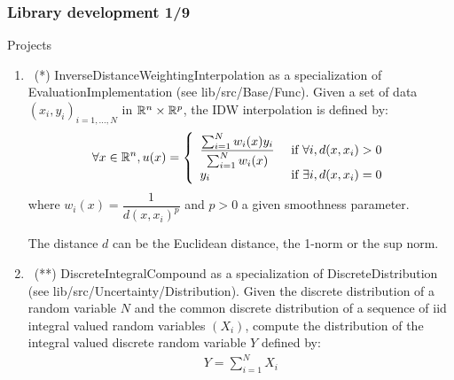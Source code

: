 \documentclass[8pt]{beamer}
\begin{document}
\begin{frame}
  \frametitle{Library development 1/9}
  \begin{block}{Projects}
    \begin{enumerate}
    \item~(*) \alert{\ttfamily InverseDistanceWeightingInterpolation} as a specialization of \alert{\ttfamily EvaluationImplementation} (see {\ttfamily lib/src/Base/Func}). Given a set of data $(x_i, y_i)_{i=1,\dots,N}$ in ${\mathbb R}^n\times{\mathbb R}^p$, the IDW interpolation is defined by:
      \begin{align}
        \forall x\in{\mathbb R}^n, u(x)=\left\{\begin{array}{ll}
                                        \dfrac{\sum_{i=1}^Nw_i(x)y_i}{\sum_{i=1}^Nw_i(x)} & \mbox{ if } \forall i, d(x, x_i) > 0\\
                                        y_i & \mbox{ if } \exists i, d(x, x_i)=0
                                      \end{array}
                                              \right.
      \end{align}
      where $w_i(x)=\dfrac{1}{d(x, x_i)^p}$ and $p>0$ a given smoothness parameter.

      The distance $d$ can be the Euclidean distance, the 1-norm or the sup norm.
    \item~(**) \alert{\ttfamily DiscreteIntegralCompound} as a specialization of \alert{\ttfamily DiscreteDistribution} (see {\ttfamily lib/src/Uncertainty/Distribution}). Given the discrete distribution of a random variable $N$ and the common discrete distribution of a sequence of iid integral valued random variables $(X_i)$, compute the distribution of the integral valued discrete random variable $Y$ defined by:
      \begin{align}
        Y = \sum_{i=1}^N X_i
      \end{align}
    \end{enumerate}
  \end{block}
\end{frame}
\end{document}
